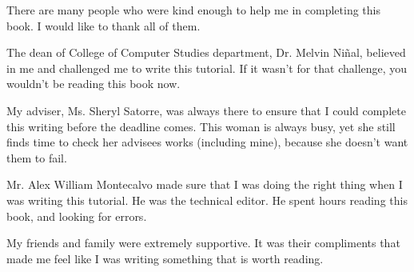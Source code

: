 There are many people who were kind enough to help me in completing this book. I would like to thank all of them.

The dean of College of Computer Studies department, Dr. Melvin Niñal, believed in me and challenged me to write this tutorial. If it wasn't for that challenge, you wouldn't be reading this book now.

My adviser, Ms. Sheryl Satorre, was always there to ensure that I could complete this writing before the deadline comes. This woman is always busy, yet she still finds time to check her advisees works (including mine), because she doesn't want them to fail. 

Mr. Alex William Montecalvo made sure that I was doing the right thing when I was writing this tutorial. He was the technical editor. He spent hours reading this book, and looking for errors.

My friends and family were extremely supportive. It was their compliments that made me feel like I was writing something that is worth reading.
